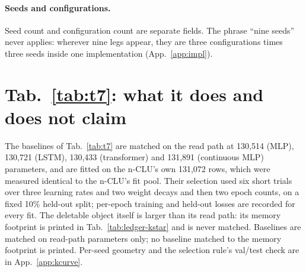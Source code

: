 \documentclass{article} %
\begin{document}
\paragraph{Seeds and configurations.} Seed count and configuration count are separate fields. The
phrase ``nine seeds'' never applies: wherever nine legs appear, they are three configurations
times three seeds inside one implementation (App.~\ref{app:impl}).

\section{Tab.~\ref{tab:t7}: what it does and does not claim}
\label{app:t7more}
The baselines of Tab.~\ref{tab:t7} are matched on the read path at 130,514 (MLP), 130,721 (LSTM), %
130,433 (transformer) and 131,891 (continuous MLP) parameters, and are fitted on the n-CLU's own %
131,072 rows, which were measured identical to the n-CLU's fit pool. Their selection used six short %
trials over three learning rates and two weight decays and then two epoch counts, on a fixed 10\%
held-out split; per-epoch training and held-out losses are recorded for every fit. %
The deletable object itself is larger than its read path: its memory footprint is printed
in Tab.~\ref{tab:ledger-kstar} and is never matched. Baselines are matched on read-path
parameters only; no baseline matched to the memory footprint is printed.
Per-seed geometry and the selection rule's val/test check are in App.~\ref{app:kcurve}.
\end{document}
